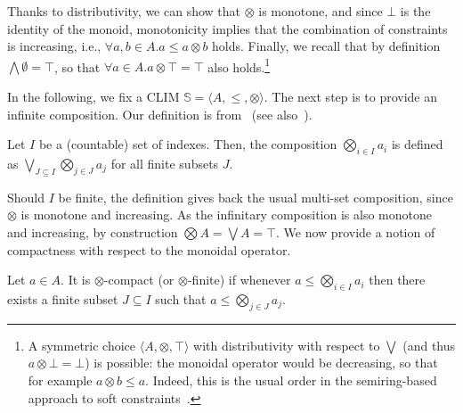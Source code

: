 \documentclass[main.tex]{subfiles}
\begin{document}
Thanks to distributivity, we can show that
$\otimes$ is monotone, and since $\bot$ is the identity of the monoid,
monotonicity implies that the combination of constraints is increasing, i.e.,
$\forall a, b \in A. a \leq a \otimes b$ holds.
%
Finally, we recall that by definition $\bigwedge \emptyset = \top$, so that 
$\forall a \in A. a \otimes  \top = \top$ also holds.\footnote{A symmetric 
choice $\langle A, \otimes, \top \rangle$
with distributivity with respect to $\bigvee$ (and thus
$a \otimes \bot = \bot$)
is possible: the monoidal operator would be decreasing, so that for
example $a \otimes b \leq a$. Indeed, this is the usual order in the
semiring-based approach to soft constraints~\cite{ecai06}.}
%

In the following, we fix a CLIM ${\mathbb S} = \langle A, \leq, \otimes \rangle$.
%
The next step is to provide an infinite composition. Our definition is from~\cite{CLIM}
(see also~\cite[p.~42]{golan}).

\begin{definition}
Let $I$ be a (countable) set of indexes. Then, the composition $\bigotimes_{i \in I} a_i$
is defined as $\bigvee_{J \subseteq I} \bigotimes_{j \in J} a_j$ for all finite subsets $J$.
\end{definition}

Should $I$ be finite, the definition gives back the usual multi-set composition,
since $\otimes$ is monotone and increasing.
%
As the infinitary composition is also monotone and increasing, by construction 
$\bigotimes A = \bigvee A = \top$.
%
We now provide a notion of compactness with respect to the
monoidal operator.

\begin{definition}\label{def:compactness}
Let $a \in A$. It is $\otimes$-compact 
(or $\otimes$-finite) 
if whenever $a \leq \bigotimes_{i \in I} a_i$
then there exists a finite subset $J \subseteq I$ such that $a \leq \bigotimes_{j \in J} a_j$.
\end{definition}
\end{document}
